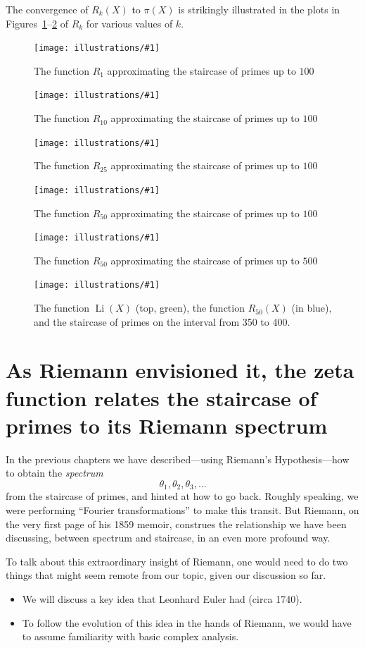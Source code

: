 \documentclass[openany]{book}
\DeclareMathOperator{\Li}{Li}
\newcommand{\ill}[3]{%
   \begin{figure}[H]%
   \vspace{-2ex}
   \centering%
   \texttt{[image: illustrations/\#1]}%
   \caption{#3}%
   \vspace{-2ex}
    \end{figure}}
\theoremstyle{plain}
\theoremstyle{definition}
\begin{document}
{{The convergence of $R_k(X)$ to $\pi(X)$ is strikingly illustrated
in the plots in Figures~\ref{fig:rkfirst}--\ref{fig:rklast} of $R_k$ for various values of $k$.


\ill{Rk_1_2_100}{.9}{The function $R_{1}$ approximating the staircase of primes up to $100$\label{fig:rkfirst}}

\ill{Rk_10_2_100}{.9}{The function $R_{10}$ approximating the staircase of primes up to $100$}

\ill{Rk_25_2_100}{.9}{The function $R_{25}$ approximating the staircase of primes up to $100$}

\ill{Rk_50_2_100}{.9}{The function $R_{50}$ approximating the staircase of primes up to $100$}


\ill{Rk_50_2_500}{.9}{The function $R_{50}$ approximating the staircase of primes up to $500$}

\ill{Rk_50_350_400}{.9}{The function $\Li(X)$ (top, green), the function $R_{50}(X)$ (in blue), and the staircase of primes on the interval from 350 to 400.\label{fig:rklast}}


\chapter[As Riemann envisioned it]{As Riemann envisioned it, the zeta function relates the staircase of primes to its Riemann spectrum\label{ch:envision}}
In the previous chapters we have described---using Riemann's
Hypothesis---how to obtain the {\it
  spectrum} $$\theta_1,\theta_2,\theta_3,\dots$$ from the staircase of
primes, and hinted at how to go back. Roughly speaking, we were
performing ``Fourier transformations'' to make this transit. But
Riemann, on the very first page of his 1859 memoir, construes the
relationship we have been discussing, between spectrum and staircase,
in an even more profound way.

To talk about this extraordinary insight of Riemann, one would need to
do two things that might seem remote from our topic, given our
discussion so far.

\begin{itemize} \item We will discuss a key idea that Leonhard Euler
  had (circa 1740).
 \item To follow the evolution of this idea in the hands of Riemann, we would have to assume familiarity with basic complex analysis.
 \end{itemize}

}}
\end{document}
